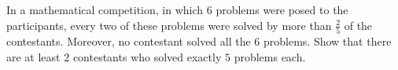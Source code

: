 In a mathematical competition, in which $6$ problems were posed to the participants, every two of these problems were solved by more than $\frac 25$ of the contestants. Moreover, no contestant solved all the $6$ problems. Show that there are at least $2$ contestants who solved exactly $5$ problems each.

